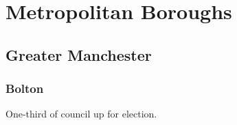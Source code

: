 \documentclass[a4paper,openany]{book}
\begin{document}




\part{Metropolitan Boroughs}

\chapter{Greater Manchester}

\section{Bolton}

One-third of council up for election.
\end{document}
